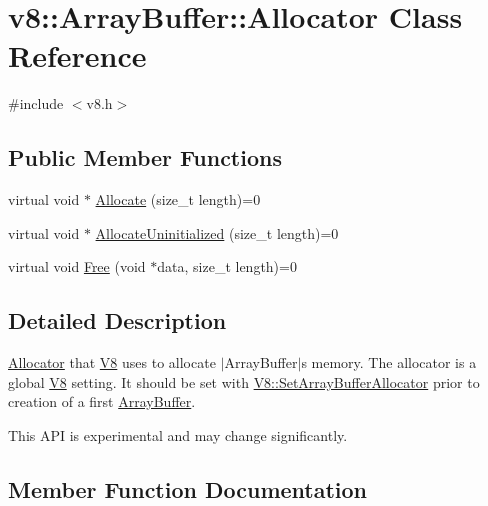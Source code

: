 \hypertarget{classv8_1_1ArrayBuffer_1_1Allocator}{}\section{v8\+:\+:Array\+Buffer\+:\+:Allocator Class Reference}
\label{classv8_1_1ArrayBuffer_1_1Allocator}


{\ttfamily \#include $<$v8.\+h$>$}

\subsection*{Public Member Functions}
\begin{DoxyCompactItemize}
\item 
virtual void $\ast$ \hyperlink{classv8_1_1ArrayBuffer_1_1Allocator_a106b0d80120ed04fe9b9675e96f0340b}{Allocate} (size\+\_\+t length)=0
\item 
virtual void $\ast$ \hyperlink{classv8_1_1ArrayBuffer_1_1Allocator_a92b2d5c0a826d3c435e12f3ee178f37a}{Allocate\+Uninitialized} (size\+\_\+t length)=0
\item 
virtual void \hyperlink{classv8_1_1ArrayBuffer_1_1Allocator_a419f59d2a103a5a8863809d7977c9cd8}{Free} (void $\ast$data, size\+\_\+t length)=0
\end{DoxyCompactItemize}


\subsection{Detailed Description}
\hyperlink{classv8_1_1ArrayBuffer_1_1Allocator}{Allocator} that \hyperlink{classv8_1_1V8}{V8} uses to allocate $\vert$\+Array\+Buffer$\vert$\textquotesingle{}s memory. The allocator is a global \hyperlink{classv8_1_1V8}{V8} setting. It should be set with \hyperlink{classv8_1_1V8_abc40950a39f8cb6946dc8a1ad41eea84}{V8\+::\+Set\+Array\+Buffer\+Allocator} prior to creation of a first \hyperlink{classv8_1_1ArrayBuffer}{Array\+Buffer}.

This A\+P\+I is experimental and may change significantly. 

\subsection{Member Function Documentation}
\hypertarget{classv8_1_1ArrayBuffer_1_1Allocator_a106b0d80120ed04fe9b9675e96f0340b}{}
